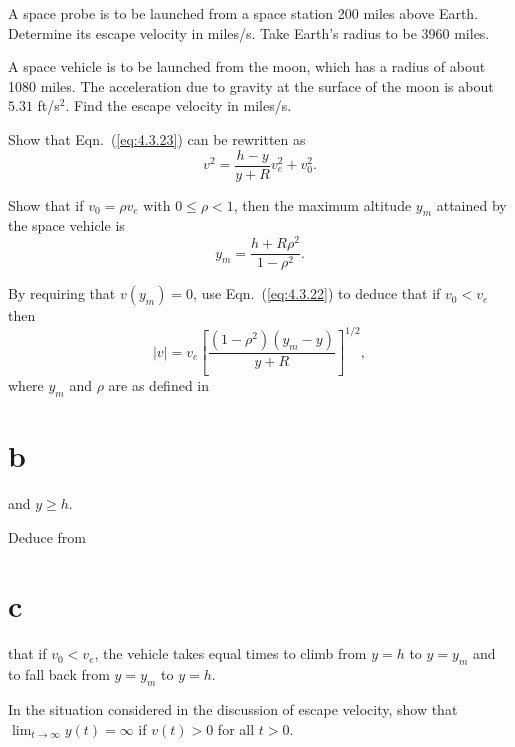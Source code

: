\begin{exerciselist}
  \item\label{exer:4.3.17} A space probe is to be launched from a space station 200 miles above
        Earth. Determine its escape velocity in miles/s. Take Earth's radius to be 3960 miles.

  \item\label{exer:4.3.18} A space vehicle is to be launched from the moon, which has a radius of
        about 1080 miles. The acceleration due to gravity at the surface of the moon is about $5.31$
        ft/s$^{2}$. Find the escape velocity in miles/s.

  \item\label{exer:4.3.19}
  \begin{alist}
    \item %
    Show that Eqn.~(\ref{eq:4.3.23}) can be rewritten as
    \[
      v^{2}=\frac{h-y}{y+R}v^{2}_{e}+v_{0}^{2}.
    \]

    \item %
    Show that if $v_{0}=\rho v_{e}$ with $0\le\rho<1$, then the maximum altitude $y_{m}$ attained by
    the space vehicle is
    \[
      y_{m}=\frac{h+R\rho^{2}}{1-\rho^{2}}.
    \]

    \item %
    By requiring that $v(y_{m})=0$, use Eqn.~(\ref{eq:4.3.22}) to deduce that if $v_{0}<v_{e}$ then
    \[
      |v|=v_{e}\left[\frac{(1-\rho^{2})(y_{m}-y)}{y+R}\right]^{1/2},
    \]
    where $y_{m}$ and $\rho$ are as defined in \part{b} and $y\ge h$.

    \item %
    Deduce from \part{c} that if $v_{0}<v_{e}$, the vehicle takes equal times to climb from $y=h$ to
    $y=y_{m}$ and to fall back from $y=y_{m}$ to $y=h$.
  \end{alist}

  \item\label{exer:4.3.20} In the situation considered in the discussion of escape velocity, show
        that $\lim_{t\to\infty}y(t)=\infty$ if $v(t)>0$ for all $t>0$.

\end{exerciselist}

